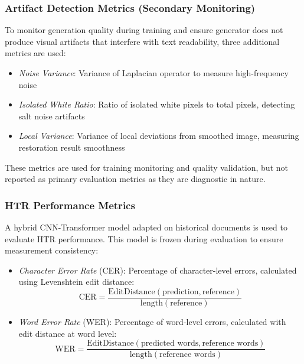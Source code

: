 \documentclass[journal]{IEEEtran}
\begin{document}
\subsubsection{Artifact Detection Metrics (Secondary Monitoring)}

To monitor generation quality during training and ensure generator does not produce visual artifacts that interfere with text readability, three additional metrics are used:

\begin{itemize}
    \item \textit{Noise Variance}: Variance of Laplacian operator to measure high-frequency noise
    
    \item \textit{Isolated White Ratio}: Ratio of isolated white pixels to total pixels, detecting salt noise artifacts
    
    \item \textit{Local Variance}: Variance of local deviations from smoothed image, measuring restoration result smoothness
\end{itemize}

These metrics are used for training monitoring and quality validation, but not reported as primary evaluation metrics as they are diagnostic in nature.

\subsubsection{HTR Performance Metrics}

A hybrid CNN-Transformer model adapted on historical documents is used to evaluate HTR performance. This model is frozen during evaluation to ensure measurement consistency:

\begin{itemize}
    \item \textit{Character Error Rate} (CER): Percentage of character-level errors, calculated using Levenshtein edit distance:
    \begin{equation}
    \text{CER} = \frac{\text{EditDistance}(\text{prediction}, \text{reference})}{\text{length}(\text{reference})}
    \end{equation}
    
    \item \textit{Word Error Rate} (WER): Percentage of word-level errors, calculated with edit distance at word level:
    \begin{equation}
    \text{WER} = \frac{\text{EditDistance}(\text{predicted words}, \text{reference words})}{\text{length}(\text{reference words})}
    \end{equation}
\end{itemize}
\end{document}
